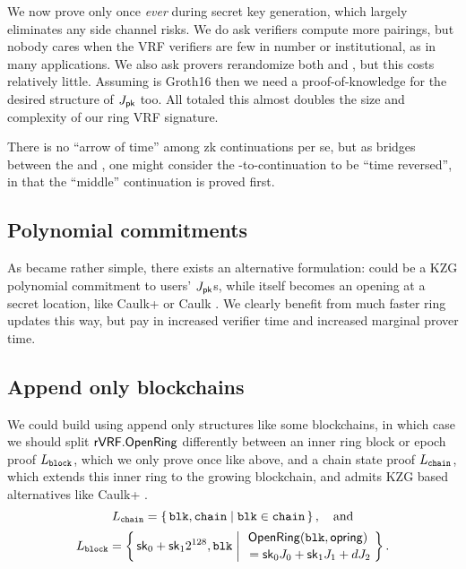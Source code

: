 We now prove \pisk only once {\it ever} during secret key generation,
which largely eliminates any side channel risks.
We do ask verifiers compute more pairings, but nobody cares when
the VRF verifiers are few in number or institutional,
as in many applications.
We also ask provers rerandomize both \pisk and \pipk, but this costs relatively little.
Assuming \pipk is Groth16 then we need a proof-of-knowledge for the desired structure of $J_\mathsf{pk}$ too.
All totaled this almost doubles the size and complexity of our ring VRF signature.

There is no ``arrow of time'' among zk continuations per se, but
as \pisk bridges between the \PedVRF and \pipk,
one might consider the \pisk-to-\pipk continuation to be ``time reversed'',
 in that the ``middle'' continuation is proved first.


\subsection{Polynomial commitments}

As \pipk became rather simple, %
there exists an alternative formulation:  
\comring could be a KZG polynomial commitment \cite{KZG} to users' $J_\mathsf{pk}$s,
while \pipk itself becomes an opening at a secret location, like
Caulk+ \cite{caulk+} or Caulk \cite{caulk}.
We clearly benefit from much faster ring updates this way, but pay in
 increased verifier time and increased marginal prover time.


\subsection{Append only blockchains}

\def\comblock{\ensuremath{\mathsf{comblock}}\xspace}
\newcommand\pichain{\ensuremath{\pi_{\mathtt{chain}}}\xspace}

We could build \ring using append only structures like some blockchains,
in which case we should split ${\mathsf{rVRF}}.{\mathsf{OpenRing}}$ differently between
an inner ring block or epoch proof $L_{\mathtt{block}}$,
 which we only prove once like \pisk above, and
a chain state proof $L_{\mathtt{chain}}$,
 which extends this inner ring to the growing blockchain, and
 admits KZG based alternatives like Caulk+ \cite{caulk+}.
%
$$ \baseL_{\mathtt{chain}} = \Setst{ \mathtt{blk}, \mathtt{chain} }{
	\mathtt{blk} \in \mathtt{chain}
} \mathcomma \quad\textrm{and} $$ 
%
$$ \baseL_{\mathtt{block}} = \Setst{ \sk_0 + \sk_1 2^{128}, \mathtt{blk} }{
	\eprint{\exists d,\openring \textrm{\ s.t.\ }}{}
	\genfrac{}{}{0pt}{}{ \OpenRing(\mathtt{blk},\openring) }{ \,\, = \sk_0 \genJ_0 + \sk_1 \genJ_1 + d \genJ_2 }
} \mathperiod $$  

